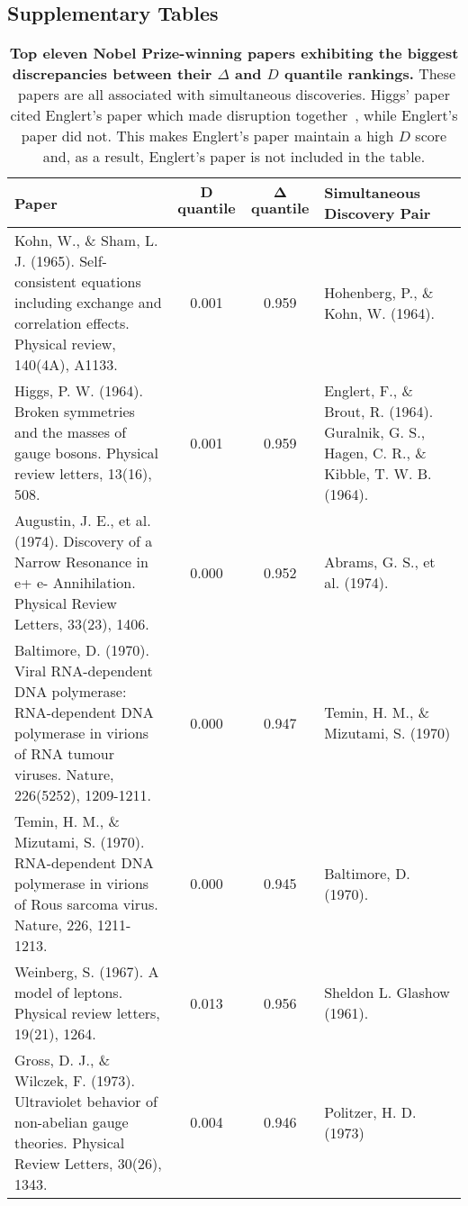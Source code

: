 \documentclass[12pt]{article}
\begin{document}
\begin{refsection}
\subsection*{Supplementary Tables}
\begin{table}
    \centering
    \caption{ \textbf{Top eleven Nobel Prize-winning papers exhibiting the biggest discrepancies between their $\Delta$ and $D$ quantile rankings.} These papers are all associated with simultaneous discoveries. Higgs' paper cited Englert's paper which made disruption together~\cite{englert1964broken}, while Englert's paper did not. This makes Englert's paper maintain a high $D$ score and, as a result, Englert's paper is not included in the table. } \label{tab:d_and_delta_nobel}
    \footnotesize
    \begin{tabularx}{\linewidth}{|p{7 cm}|c|c|p{4 cm}} 
        \toprule
        \textbf{Paper} &  \(\mathbf{D}\) quantile & \(\mathbf{\Delta}\) quantile
        & \textbf{Simultaneous Discovery Pair}
        \\
        \midrule
   \footnotesize
 Kohn, W., \& Sham, L. J. (1965). Self-consistent equations including  exchange and correlation effects. Physical review, 140(4A), A1133.& 0.001&0.959 & 
Hohenberg, P., \& Kohn, W. (1964). \\ 
    \hline

  Higgs, P. W. (1964). Broken symmetries and the masses of gauge bosons. Physical review letters, 13(16), 508. & 0.001& 0.959 & Englert, F., \& Brout, R. (1964). Guralnik, G. S., Hagen, C. R., \& Kibble, T. W. B. (1964). \\ 
    \hline
    Augustin, J. E., et al. (1974). Discovery of a Narrow Resonance in e+ e- Annihilation.   Physical Review Letters, 33(23), 1406.& 0.000&  0.952&Abrams, G. S., et al. (1974).\\ 
    \hline
      Baltimore, D. (1970). Viral RNA-dependent DNA polymerase: RNA-dependent DNA polymerase in virions of RNA tumour viruses. Nature, 226(5252), 1209-1211. &0.000 &0.947 & Temin, H. M., \& Mizutami, S. (1970) \\ 
    \hline
     Temin, H. M., \& Mizutami, S. (1970). RNA-dependent DNA polymerase in virions of Rous sarcoma virus. Nature, 226, 1211-1213. &0.000 &0.945
 & Baltimore, D. (1970). \\ 
    \hline
 Weinberg, S. (1967). A model of leptons. Physical review letters, 19(21), 1264. &0.013 &0.956& Sheldon L. Glashow (1961).  \\ 
    \hline
       
       Gross, D. J., \& Wilczek, F. (1973). Ultraviolet behavior of non-abelian gauge theories. Physical Review Letters, 30(26), 1343. & 0.004& 0.946& Politzer, H. D. (1973)\\ 
    \hline
     

\end{tabularx}
\end{table}
\end{refsection}
\end{document}
